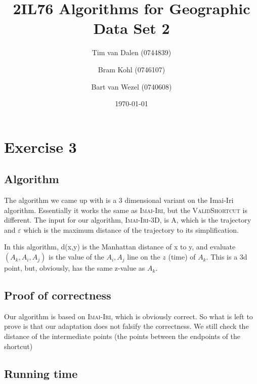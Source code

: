 \documentclass[a4paper,11pt]{article}
\title{
	2IL76 Algorithms for Geographic Data Set 2 \\
}
\author{
	Tim van Dalen (0744839)
	\and
	Bram Kohl (0746107)
	\and
	Bart van Wezel (0740608)
}
\date{\today}
\begin{document}
	\maketitle
	
\section*{Exercise 3}
\subsection*{Algorithm}
The algorithm we came up with is a 3 dimensional variant on the Imai-Iri algorithm. Essentially it works the same as \textsc{Imai-Iri}, but the \textsc{ValidShortcut} is different. The input for our algorithm, \textsc{Imai-Iri-3D}, is A, which is the trajectory and $\varepsilon$ which is the maximum distance of the trajectory to its simplification.



In this algorithm, d(x,y) is the Manhattan distance of x to y, and evaluate$(A_k,A_i,A_j)$ is the value of the $A_i,A_j$ line on the $z$ (time) of $A_k$. This is a 3d point, but, obviously, has the same z-value as $A_k$.

\subsection*{Proof of correctness}
Our algorithm is based on \textsc{Imai-Iri}, which is obviously correct. So what is left to prove is that our adaptation does not falsify the correctness. We still check the distance of the intermediate points (the points between the endpoints of the shortcut)

\subsection*{Running time}

\end{document}
